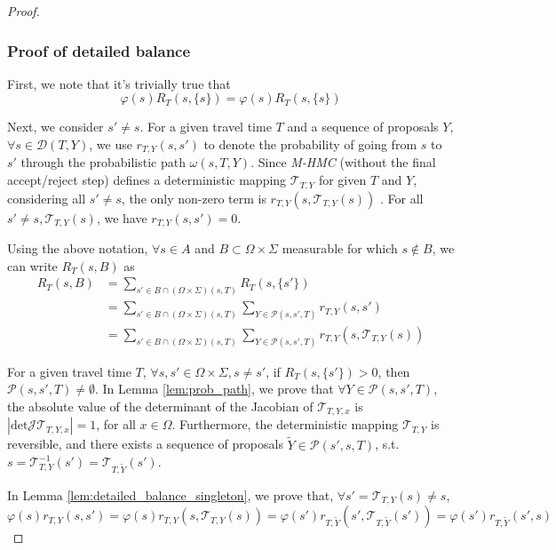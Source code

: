 \documentclass{article}
\begin{document}
\begin{proof}
\subsubsection*{Proof of detailed balance}
First, we note that it's trivially true that
\begin{equation}\label{eqn:trivial}
\varphi(s)R_T(s, \{s\}) = \varphi(s) R_T(s, \{s\})
\end{equation}


Next, we consider $s'\neq s$. For a given travel time $T$ and a sequence of proposals $Y$, $\forall s\in\mathcal{D}(T, Y)$, we use $r_{T, Y}(s, s')$ to denote the probability of going from $s$ to $s'$ through the probabilistic path $\omega(s, T, Y)$. Since \textit{M-HMC} (without the final accept/reject step) defines a deterministic mapping $\mathcal{T}_{T, Y}$ for given $T$ and $Y$, considering all $s'\neq s$, the only non-zero term is $r_{T, Y}(s, \mathcal{T}_{T, Y}(s))$ . For all $s'\neq s, \mathcal{T}_{T, Y}(s)$, we have $r_{T, Y}(s, s')=0$.

Using the above notation, $\forall s\in A$ and $B\subset \Omega\times\Sigma$ measurable for which $s\notin B$, we can write $R_T(s, B)$ as
\begin{align*}
	R_T (s, B) &= \sum_{s' \in B\cap(\Omega\times\Sigma)(s, T)} R_T (s, \{ s' \})\\
		   &= \sum_{s' \in B\cap(\Omega\times\Sigma)(s, T)}\sum_{Y\in\mathcal{P}(s, s', T)}r_{T, Y}(s, s')\\
		   &= \sum_{s' \in B\cap(\Omega\times\Sigma)(s, T)}\sum_{Y\in\mathcal{P}(s, s', T)}r_{T, Y}(s, \mathcal{T}_{T, Y}(s))
\end{align*}

For a given travel time $T$, $\forall s, s'\in \Omega\times\Sigma, s\neq s'$, if $R_T(s, \{ s' \}) > 0$, then $\mathcal{P}(s, s', T)\neq\emptyset$. In Lemma \ref{lem:prob_path}, we prove that $\forall Y\in\mathcal{P}(s, s', T)$, the absolute value of the determinant of the Jacobian of $\mathcal{T}_{T, Y, x}$ is $|\text{det}\mathcal{J}\mathcal{T}_{T, Y, x}| = 1$, for all $x\in\Omega$. Furthermore, the deterministic mapping $\mathcal{T}_{T, Y}$ is reversible, and there exists a sequence of proposals $\tilde{Y}\in\mathcal{P}(s', s, T)$, s.t. $s = \mathcal{T}_{T, Y}^{-1}(s') = \mathcal{T}_{T, \tilde{Y}}(s')$.

In Lemma \ref{lem:detailed_balance_singleton}, we prove that, $\forall s'=\mathcal{T}_{T, Y}(s)\neq s$,
\begin{equation*}
	\varphi (s) r_{T, Y} (s, s') = \varphi(s)r_{T, Y}(s, \mathcal{T}_{T, Y}(s)) = \varphi (s') r_{T, \tilde{Y}} (s', \mathcal{T}_{T, \tilde{Y}}(s')) = \varphi (s') r_{T, \tilde{Y}} (s', s)
\end{equation*}


\end{proof}
\end{document}
